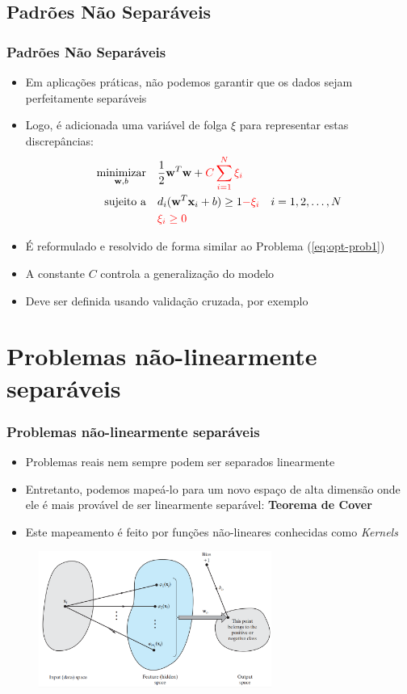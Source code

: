 \documentclass{beamer}
\begin{document}
\subsection{Padrões Não Separáveis}
\begin{frame}
	\frametitle{Padrões Não Separáveis}
	\begin{itemize}
		\item Em aplicações práticas, não podemos garantir que os dados sejam perfeitamente separáveis
		\item Logo, é adicionada uma variável de folga $\xi$ para representar estas discrepâncias:
		\begin{align}
			\underset{\textbf{w},b}{\text{minimizar}} \quad & \frac{1}{2}\textbf{w}^T\textbf{w} + \textcolor{red}{C\sum_{i=1}^{N}\xi_i} \\ 
			\text{sujeito a} \quad & d_i(\textbf{w}^T\textbf{x}_i + b) \geq 1 \textcolor{red}{- \xi_i} \quad i=1,2,\dots,N   \nonumber \\
			& \textcolor{red}{\xi_i \geq 0} \nonumber
		\end{align} 
		\item É reformulado e resolvido de forma similar ao Problema (\ref{eq:opt-prob1})
		\item A constante $C$ controla a generalização do modelo
		\item Deve ser definida usando validação cruzada, por exemplo
	\end{itemize}
	
\end{frame}


\section{Problemas não-linearmente separáveis}
\begin{frame}
	\frametitle{Problemas não-linearmente separáveis}
	\begin{itemize}
		\item Problemas reais nem sempre podem ser separados linearmente
		\item Entretanto, podemos mapeá-lo para um novo espaço de alta dimensão onde ele é mais provável de ser linearmente separável: \textbf{Teorema de Cover} \cite{cover}
		\item Este mapeamento é feito por funções não-lineares conhecidas como \textit{Kernels}
	\end{itemize}
	\begin{figure}[h!]
		\centering
		\includegraphics[width=3in]{fig05.png}
		\label{fig:kernel-trick}
	\end{figure}
\end{frame}
\end{document}
